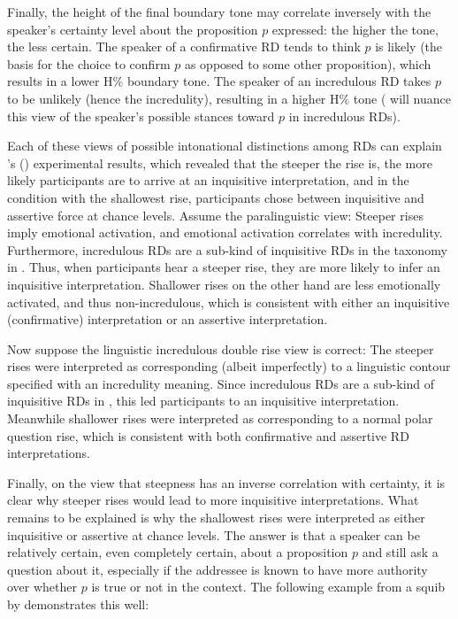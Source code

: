 \documentclass[output=paper,colorlinks,citecolor=brown]{langscibook}
\begin{document}
	Finally, the height of the final boundary tone may correlate inversely with the speaker's certainty level about the proposition $p$ expressed: the higher the tone, the less certain. The speaker of a confirmative RD tends to think $p$ is likely (the basis for the choice to confirm $p$ as opposed to some other proposition), which results in a lower H\% boundary  tone. The speaker of an incredulous RD takes $p$ to be unlikely (hence the incredulity), resulting in a higher H\% tone ( will nuance this view of the speaker's possible stances toward $p$ in incredulous RDs). 
	
	Each of these views of possible intonational distinctions among RDs can explain \citeauthor{jeong18}'s (\citeyear[320ff.]{jeong18}) experimental results, which revealed that the steeper the rise is, the more likely participants are to arrive at an inquisitive interpretation, and in the condition with the shallowest rise, participants chose between inquisitive and assertive force at chance levels. Assume the paralinguistic view: Steeper rises imply emotional activation, and emotional activation correlates with incredulity. Furthermore, incredulous RDs are a sub-kind of inquisitive RDs in the taxonomy in . Thus, when participants hear a steeper rise, they are more likely to infer an inquisitive interpretation. Shallower rises on the other hand are less emotionally activated, and thus non-incredulous, which is consistent with either an inquisitive (confirmative) interpretation or an assertive interpretation. 
	
	Now suppose the linguistic incredulous double rise view is correct: The steeper rises were interpreted as corresponding (albeit imperfectly) to a linguistic contour specified with an incredulity meaning. Since incredulous RDs are a sub-kind of inquisitive RDs in , this led participants to an inquisitive interpretation. Meanwhile shallower rises were interpreted as corresponding to a normal polar question rise, which is consistent with both confirmative and assertive RD interpretations. 
	
	Finally, on the view that steepness has an inverse correlation with certainty, it is clear why steeper rises would lead to more inquisitive interpretations. What remains to be explained is why the shallowest rises were interpreted as either inquisitive or assertive at chance levels. The answer is that a speaker can be relatively certain, even completely certain, about a proposition $p$ and still ask a question about it, especially if the addressee is known to have more authority over whether $p$ is true or not in the context. The following example from a squib by \citet{sider22} demonstrates this well:
	
\end{document}
